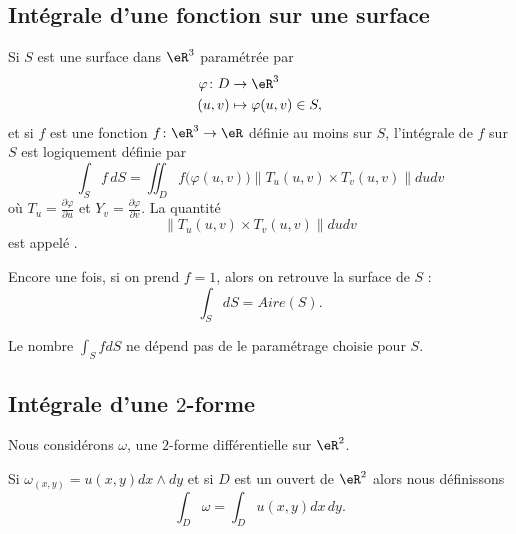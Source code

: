 \subsection{Intégrale d'une fonction sur une surface}

Si \( S\) est une surface dans \( \eR^3\) paramétrée par
\begin{equation}
	\begin{aligned}
		\varphi\colon D & \to \eR^3                  \\
		(u,v)           & \mapsto \varphi(u,v)\in S,
	\end{aligned}
\end{equation}
et si \( f\) est une fonction \( f\colon \eR^3\to \eR\) définie au moins sur \( S\), l'intégrale de \( f\) sur \( S\) est logiquement définie par
\begin{equation}
	\int_S f\,dS=\iint_D f\big( \varphi(u,v) \big)\| T_u(u,v)\times T_v(u,v) \|dudv
\end{equation}
où \( T_u=\frac{ \partial \varphi }{ \partial u }\) et \( Y_v=\frac{ \partial \varphi }{ \partial v }\). La quantité
\begin{equation}
	\| T_u(u,v)\times T_v(u,v) \|dudv
\end{equation}
est appelé .

Encore une fois, si on prend \( f=1\), alors on retrouve la surface de \( S\) :
\begin{equation}
	\int_SdS=Aire(S).
\end{equation}

\begin{remark}
	Le nombre \( \int_SfdS\) ne dépend pas de le paramétrage choisie pour \( S\).
\end{remark}


\subsection{Intégrale d'une \( 2\)-forme}

Nous considérons \( \omega\), une \( 2\)-forme différentielle sur \( \eR^2\).
\begin{definition}
	Si \( \omega_{(x,y)}=u(x,y)dx\wedge dy\) et si \( D\) est un ouvert de \( \eR^2\) alors nous définissons
	\begin{equation}
		\int_D\omega=\int_D u(x,y)dx\,dy.
	\end{equation}
\end{definition}

